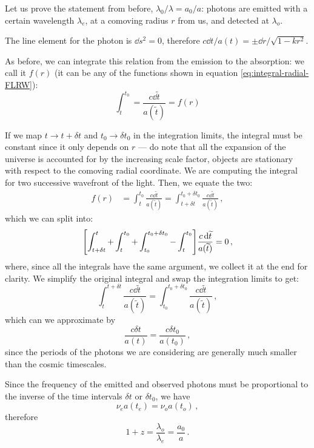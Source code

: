 \documentclass[main.tex]{subfiles}
\begin{document}
Let us prove the statement from before, \(\lambda_0 / \lambda  = a_0 / a\):
photons are emitted with a certain wavelength \(\lambda_{e}\), at a comoving radius \(r\) from us, and detected at \(\lambda_{o}\).

The line element for the photon is \(\dd{s^2} =0\), therefore \(c\dd{t}/ a(t) = \pm \dd{r} / \sqrt{1-kr^2} \).

As before, we can integrate this relation from the emission to the absorption: we call it \(f(r)\) (it can be any of the functions shown in equation \eqref{eq:integral-radial-FLRW}):
\begin{equation}
  \int_{t}^{t_0 } = \frac{c\dd{\widetilde{t}}}{a(\widetilde{t})} = f(r)
\end{equation}

If we map \(t \rightarrow t + \delta t\) and \(t_0 \rightarrow \delta t_0 \) in the integration limits, the integral must be constant since it only depends on \(r\) --- do note that all the expansion of the universe is accounted for by the increasing scale factor, objects are stationary with respect to the comoving radial coordinate.
We are computing the integral for two successive wavefront of the light.
Then, we equate the two: 
%
\begin{align}
f(r) &= \int_{t}^{t_0 } \frac{c \dd{\widetilde{t} }}{a(\widetilde{t})} = \int_{t+\delta t}^{t_0 + \delta t_0 } \frac{c \dd{\widetilde{t} }}{a(\widetilde{t})}
\,,
\end{align}
%
which we can split into: 
%
\begin{align}
\qty[\int_{t+ \delta t}^{t} + \int_{t}^{t_0} + \int_{t_0 }^{t_0 + \delta t_0 } - \int_{t}^{t_0 }] \frac{c \dd{\widetilde{t}}}{a(\widetilde{t})} = 0
\,,
\end{align}
%
where, since all the integrals have the same argument, we collect it at the end for clarity.
We simplify the original integral and swap the integration limits to get:
\begin{equation}
  \int_{t}^{t + \delta t} \frac{c\dd{\widetilde{t}}}{a(\widetilde{t})} = \int_{t_0 }^{t_0 + \delta t_0 } \frac{c\dd{\widetilde{t}}}{a(\widetilde{t})}\,,
\end{equation}
%
which can we approximate by
\begin{equation}
\frac{c \delta t}{a(t)} =   \frac{c \delta t_0 }{a(t_0 )}\,,
\end{equation}
%
since the periods of the photons we are considering are generally much smaller than the cosmic timescales.

Since the frequency of the emitted and observed photons must be proportional to the inverse of the time intervals \(\delta t\) or \(\delta t_0 \), we have
\begin{equation}
  \nu_{e} a(t_{e}) = \nu_{o} a(t_{o})\,,
\end{equation}
%
therefore 
%
\begin{equation}
  1 + z = \frac{\lambda_{o}}{\lambda_{e}}
  = \frac{a_0 }{a}\,.
\end{equation}
\end{document}
